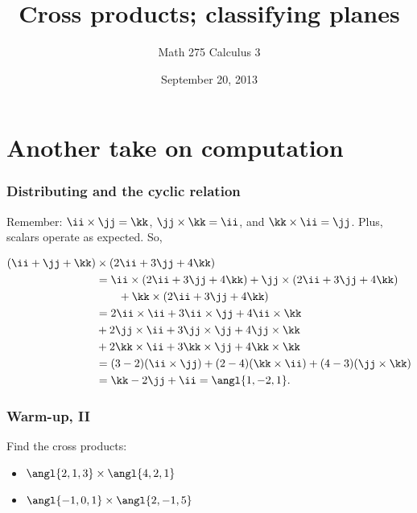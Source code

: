\documentclass[11pt,ignorenonframetext,xcolor={svgnames},aspectratio=169]{beamer}
\title{Cross products; classifying planes}
\author{Math 275 Calculus 3}
\date{September 20, 2013 }
\begin{document}
\frame{\titlepage}

\section{Another take on computation}

\begin{frame}\frametitle{Distributing and the cyclic relation}

Remember: $\ii \times \jj = \kk$, $\jj \times \kk = \ii$, and
$\kk \times \ii = \jj$. Plus, scalars operate as expected. So,

\begin{align*}
    (\ii + \jj + \kk) &\times (2 \ii + 3 \jj + 4 \kk) \\
    &= \ii \times (2 \ii + 3 \jj + 4 \kk) + \jj \times (2 \ii + 3 \jj + 4 \kk) \\
    &\qquad + \kk \times (2 \ii + 3 \jj + 4 \kk) \\
    &= 2 \ii \times \ii + 3 \ii \times \jj + 4 \ii \times \kk \\
    &+ 2 \jj \times \ii + 3 \jj \times \jj + 4 \jj \times \kk \\
    &+ 2 \kk \times \ii + 3 \kk \times \jj + 4 \kk \times \kk \\
    &= (3-2)(\ii \times \jj) + (2-4)(\kk \times \ii) + (4-3)(\jj \times \kk) \\
    &= \kk - 2 \jj + \ii = \angl{1, -2, 1}.
\end{align*}

\end{frame}

\begin{frame}\frametitle{Warm-up, II}

Find the cross products:

\begin{itemize}

\item
  $\angl{2, 1, 3} \times \angl{4, 2, 1}$
\item
  $\angl{-1, 0, 1} \times \angl{2, -1, 5}$
\end{itemize}

\end{frame}
\end{document}
